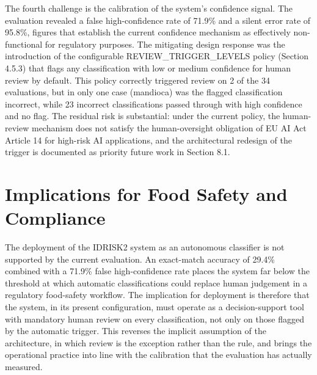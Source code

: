 The fourth challenge is the calibration of the system's confidence signal. The evaluation revealed a false high-confidence rate of 71.9\% and a silent error rate of 95.8\%, figures that establish the current confidence mechanism as effectively non-functional for regulatory purposes. The mitigating design response was the introduction of the configurable REVIEW\_TRIGGER\_LEVELS policy (Section 4.5.3) that flags any classification with low or medium confidence for human review by default. This policy correctly triggered review on 2 of the 34 evaluations, but in only one case (mandioca) was the flagged classification incorrect, while 23 incorrect classifications passed through with high confidence and no flag. The residual risk is substantial: under the current policy, the human-review mechanism does not satisfy the human-oversight obligation of EU AI Act Article 14 for high-risk AI applications, and the architectural redesign of the trigger is documented as priority future work in Section 8.1.

\hypertarget{implications-for-food-safety-and-compliance}{%
\section{Implications for Food Safety and Compliance}\label{implications-for-food-safety-and-compliance}}

The deployment of the IDRISK2 system as an autonomous classifier is not supported by the current evaluation. An exact-match accuracy of 29.4\% combined with a 71.9\% false high-confidence rate places the system far below the threshold at which automatic classifications could replace human judgement in a regulatory food-safety workflow. The implication for deployment is therefore that the system, in its present configuration, must operate as a decision-support tool with mandatory human review on every classification, not only on those flagged by the automatic trigger. This reverses the implicit assumption of the architecture, in which review is the exception rather than the rule, and brings the operational practice into line with the calibration that the evaluation has actually measured.

